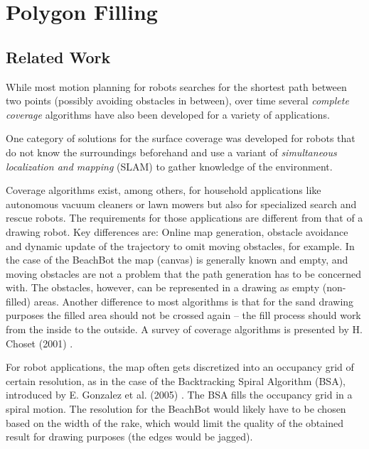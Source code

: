 \section{Polygon Filling}

\subsection{Related Work}

While most motion planning for robots searches for the shortest path between two points (possibly avoiding obstacles in between), over time several \textit{complete coverage} algorithms have also been developed for a variety of applications. 

One category of solutions for the surface coverage  was developed for robots that do not know the surroundings beforehand and use a variant of \textit{simultaneous localization and mapping} (SLAM) to gather knowledge of the environment. 

Coverage algorithms exist, among others, for household applications like autonomous vacuum cleaners or lawn mowers but also for specialized search and rescue robots. The requirements for those applications are different from that of a drawing robot. Key differences are: Online map generation, obstacle avoidance and dynamic update of the trajectory to omit moving obstacles, for example. In the case of the BeachBot the map (canvas) is generally known and empty, and moving obstacles are not a problem that the path generation has to be concerned with. The obstacles, however, can be represented in a drawing as empty (non-filled) areas. Another difference to most algorithms is that for the sand drawing purposes the filled area should not be crossed again -- the fill process should work from the inside to the outside.
A survey of coverage algorithms is presented by H. Choset (2001) \cite{choset2001coverage}.


For robot applications, the map often gets discretized into an occupancy grid of certain resolution, as in the case of the Backtracking Spiral Algorithm (BSA), introduced by E. Gonzalez et al.  (2005) \cite{gonzalez2005bsa}. The BSA fills the occupancy grid in a spiral motion. The resolution for the BeachBot would likely have to be chosen based on the width of the rake, which would limit the quality of the obtained result for drawing purposes (the edges would be jagged).

